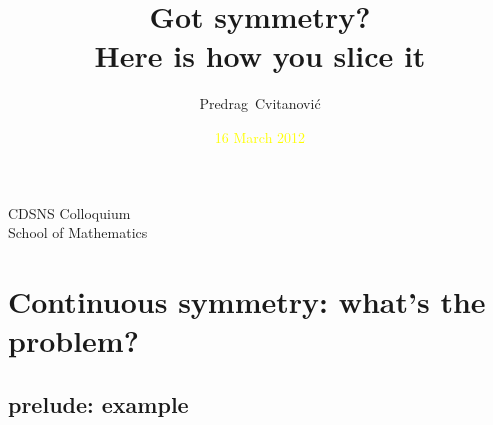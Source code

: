 





                          \date{\textcolor{yellow}{\scriptsize
 16 March 2012
                          }}

\title{Got symmetry?
       \\
       {\small Here is how you slice it}}
\author[Cvitanovi\'c]
{
  \textcolor{green!50!black}{
  {Predrag~Cvitanovi\'c}
  }
}
\institute
{
CDSNS Colloquium \\
School of Mathematics
}



\begin{frame}
  \titlepage
\end{frame}


\section[Das Problem]{Continuous symmetry: what's the problem?}
\subsection[{\cLf} example]{prelude: {\cLf} example}

